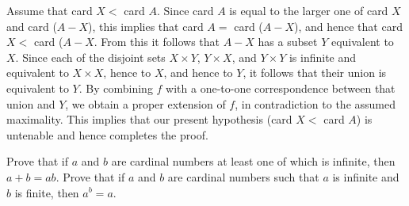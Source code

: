 Assume that card $X <$ card $A$. Since card $A$ is equal to the larger one of card $X$ and card ($A - X$), this implies that card $A =$ card ($A - X$), and hence that card $X <$ card ($A - X$. From this it follows that $A - X$ has a subset $Y$ equivalent to $X$. Since each of the disjoint sets $X \times Y$, $Y \times X$, and $Y \times Y$ is infinite and equivalent to $X \times X$, hence to $X$, and hence to $Y$, it follows that their union is equivalent to $Y$. By combining $f$ with a one-to-one correspondence between that union and $Y$, we obtain a proper extension of $f$, in contradiction to the assumed maximality. This implies that our present hypothesis (card $X <$ card $A$) is untenable and hence completes the proof. 

\begin{exercise} Prove that if $a$ and $b$ are cardinal numbers at least one of which is infinite, then $a + b = ab$. Prove that if $a$ and $b$ are cardinal numbers such that $a$ is infinite and $b$ is finite, then $a^{b} = a$.
\end{exercise}